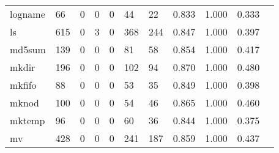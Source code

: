 \begin{longtable}{lp{1.10cm}p{1.10cm}p{1.10cm}p{1.10cm}p{1.10cm}p{1.10cm}p{1.10cm}p{1.10cm}p{1.10cm}p{1.10cm}}
logname   &                     66 &                                  0 &                                 0 &                                0 &                                44 &                              22 &                          0.833 &                                 1.000 &                               0.333 \\
ls        &                    615 &                                  0 &                                 3 &                                0 &                               368 &                             244 &                          0.847 &                                 1.000 &                               0.397 \\
md5sum    &                    139 &                                  0 &                                 0 &                                0 &                                81 &                              58 &                          0.854 &                                 1.000 &                               0.417 \\
mkdir     &                    196 &                                  0 &                                 0 &                                0 &                               102 &                              94 &                          0.870 &                                 1.000 &                               0.480 \\
mkfifo    &                     88 &                                  0 &                                 0 &                                0 &                                53 &                              35 &                          0.849 &                                 1.000 &                               0.398 \\
mknod     &                    100 &                                  0 &                                 0 &                                0 &                                54 &                              46 &                          0.865 &                                 1.000 &                               0.460 \\
mktemp    &                     96 &                                  0 &                                 0 &                                0 &                                60 &                              36 &                          0.844 &                                 1.000 &                               0.375 \\
mv        &                    428 &                                  0 &                                 0 &                                0 &                               241 &                             187 &                          0.859 &                                 1.000 &                               0.437 \\

\end{longtable}
